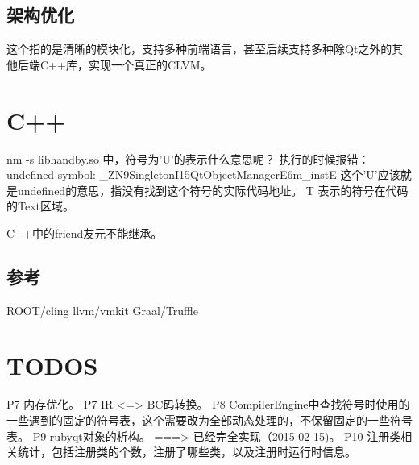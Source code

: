\section{架构优化}
这个指的是清晰的模块化，支持多种前端语言，甚至后续支持多种除Qt之外的其他后端C++库，实现一个真正的CLVM。


\chapter{C++}
nm -s libhandby.so 中，符号为'U'的表示什么意思呢？
执行的时候报错：undefined symbol: \_ZN9SingletonI15QtObjectManagerE6m\_instE
这个'U'应该就是undefined的意思，指没有找到这个符号的实际代码地址。
T 表示的符号在代码的Text区域。

C++中的friend友元不能继承。

\section{参考}
ROOT/cling
llvm/vmkit
Graal/Truffle

\chapter{TODOS}
P7  内存优化。
P7  IR <=> BC码转换。
P8  CompilerEngine中查找符号时使用的一些遇到的固定的符号表，这个需要改为全部动态处理的，不保留固定的一些符号表。
P9  rubyqt对象的析构。 ===> 已经完全实现（2015-02-15)。
P10 注册类相关统计，包括注册类的个数，注册了哪些类，以及注册时运行时信息。

